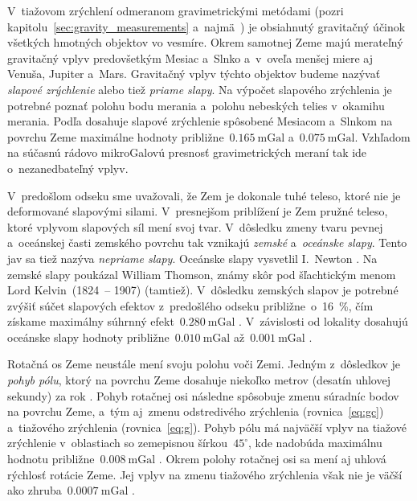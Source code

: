 \documentclass[a4paper, 12pt]{book}
\begin{document}
V~tiažovom zrýchlení odmeranom gravimetrickými metódami (pozri 
kapitolu~\ref{sec:gravity_measurements} a~najmä~\cite{Janak2010}) je obsiahnutý 
gravitačný účinok všetkých hmotných objektov vo vesmíre.  Okrem samotnej Zeme 
majú merateľný gravitačný vplyv predovšetkým Mesiac a~Slnko a~v~oveľa menšej 
miere aj Venuša, Jupiter a~Mars.  Gravitačný vplyv týchto objektov budeme 
nazývať \emph{slapové zrýchlenie} alebo tiež \emph{priame slapy}.  Na výpočet 
slapového zrýchlenia je potrebné poznať polohu bodu merania a~polohu nebeských 
telies v~okamihu merania.  Podľa \textcite{Torge1989} dosahuje slapové 
zrýchlenie spôsobené Mesiacom a~Slnkom na povrchu Zeme maximálne hodnoty 
približne~$0.165\ \mathrm{mGal}$ a~$0.075\ \mathrm{mGal}$.  Vzhľadom na súčasnú 
rádovo mikroGalovú presnosť gravimetrických meraní tak ide o~nezanedbateľný 
vplyv.

V~predošlom odseku sme uvažovali, že Zem je dokonale tuhé teleso, ktoré nie je 
deformované slapovými silami.  V~presnejšom priblížení je Zem pružné teleso, 
ktoré vplyvom slapových síl mení svoj tvar.  V~dôsledku zmeny tvaru pevnej 
a~oceánskej časti zemského povrchu tak vznikajú \emph{zemské} a~\emph{oceánske 
slapy}.  Tento jav sa tiež nazýva \emph{nepriame slapy}.  Oceánske slapy 
vysvetlil I.~Newton \parencite{Torge1989}.  Na zemské slapy poukázal William 
Thomson, známy skôr pod šľachtickým menom Lord Kelvin~(1824~-- 1907) (tamtiež).  
V~dôsledku zemských slapov je potrebné zvýšiť súčet slapových efektov 
z~predošlého odseku približne~o~16~\%, čím získame maximálny súhrnný 
efekt~$0.280\ \mathrm{mGal}$ \parencite{Torge1989}.  V~závislosti od lokality 
dosahujú oceánske slapy hodnoty približne~$0.010\ \mathrm{mGal}$ až~$0.001\ 
\mathrm{mGal}$ \parencite{Torge1989}.

Rotačná os Zeme neustále mení svoju polohu voči Zemi.  Jedným z~dôsledkov je 
\emph{pohyb pólu}, ktorý na povrchu Zeme dosahuje niekoľko metrov (desatín 
uhlovej sekundy) za rok \parencite{MoritzPhysicalGeodesy}.  Pohyb rotačnej osi 
následne spôsobuje zmenu súradníc bodov na povrchu Zeme, a~tým aj~zmenu 
odstredivého zrýchlenia (rovnica~\ref{eq:gc}) a~tiažového zrýchlenia 
(rovnica~\ref{eq:g}).  Pohyb pólu má najväčší vplyv na tiažové zrýchlenie 
v~oblastiach so zemepisnou šírkou~$45^{\circ}$, kde nadobúda maximálnu hodnotu 
približne~$0.008\ \mathrm{mGal}$ \parencite{Torge1989}.  Okrem polohy rotačnej 
osi sa mení aj uhlová rýchlosť rotácie Zeme.  Jej vplyv na zmenu tiažového 
zrýchlenia však nie je väčší ako zhruba~$0.0007\ \mathrm{mGal}$ 
\parencite{Torge1989}.
\end{document}
